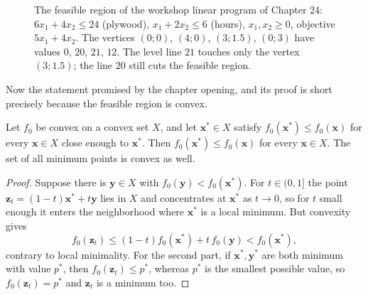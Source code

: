 \begin{figure}[!ht]
\centering
{}
\caption{The feasible region of the workshop linear program of Chapter 24:
$6x_{1}+4x_{2}\le24$ (plywood), $x_{1}+2x_{2}\le6$ (hours), $x_{1},x_{2}\ge0$, objective
$5x_{1}+4x_{2}$. The vertices $(0;0)$, $(4;0)$, $(3;1.5)$, $(0;3)$ have values $0$, $20$,
$21$, $12$. The level line $21$ touches only the vertex $(3;1.5)$; the line $20$ still cuts
the feasible region.}
\label{fig:lp-verteks}
\end{figure}


Now the statement promised by the chapter opening, and its proof is short precisely because
the feasible region is convex.

\begin{teorema}
Let $f_{0}$ be convex on a convex set $X$, and let $\mathbf{x}^{*}\in X$ satisfy
$f_{0}(\mathbf{x}^{*})\le f_{0}(\mathbf{x})$ for every $\mathbf{x}\in X$ close enough to
$\mathbf{x}^{*}$. Then $f_{0}(\mathbf{x}^{*})\le f_{0}(\mathbf{x})$ for every
$\mathbf{x}\in X$. The set of all minimum points is convex as well.
\end{teorema}

\begin{proof}
Suppose there is $\mathbf{y}\in X$ with $f_{0}(\mathbf{y})<f_{0}(\mathbf{x}^{*})$. For
$t\in(0,1]$ the point $\mathbf{z}_{t}=(1-t)\mathbf{x}^{*}+t\mathbf{y}$ lies in $X$ and
concentrates at $\mathbf{x}^{*}$ as $t\to0$, so for $t$ small enough it enters the
neighborhood where $\mathbf{x}^{*}$ is a local minimum. But convexity gives
\[
  f_{0}(\mathbf{z}_{t})\le(1-t)f_{0}(\mathbf{x}^{*})+t\,f_{0}(\mathbf{y})
  <f_{0}(\mathbf{x}^{*}),
\]
contrary to local minimality. For the second part, if $\mathbf{x}^{*},\mathbf{y}^{*}$ are both
minimum with value $p^{*}$, then $f_{0}(\mathbf{z}_{t})\le p^{*}$, whereas $p^{*}$ is the
smallest possible value, so $f_{0}(\mathbf{z}_{t})=p^{*}$ and $\mathbf{z}_{t}$ is a minimum
too.
\end{proof}

